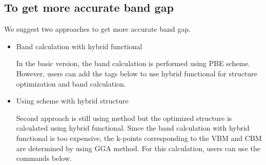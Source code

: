 \documentclass[letterpaper,10pt,english]{sphinxmanual}
\begin{document}
\begin{sphinxVerbatim}[commandchars=\\\{\}]
                           
     
     
               
                   
\end{sphinxVerbatim}


\subsection{To get more accurate band gap}
\label{\detokenize{Input/Advanced_configuration:to-get-more-accurate-band-gap}}
We suggest two approaches to get more accurate band gap.
\begin{itemize}
\item {} 
Band calculation with hybrid functional

In the basic version, the band calculation is performed using PBE scheme.
However, users can add the tags below to use hybrid functional for structure
optimization and band calculation.

\begin{sphinxVerbatim}[commandchars=\\\{\}]
     
     
\end{sphinxVerbatim}

\item {} 
Using  scheme with hybrid structure

Second approach is still using  method but the optimized structure is
calculated using hybrid functional. Since the band calculation with hybrid functional
is too expensive, the k-points corresponding to the VBM and CBM are determined by using
GGA method. For this calculation, users can use the commands below.

\begin{sphinxVerbatim}[commandchars=\\\{\}]
     
     
      
       
\end{sphinxVerbatim}

\end{itemize}
\end{document}
